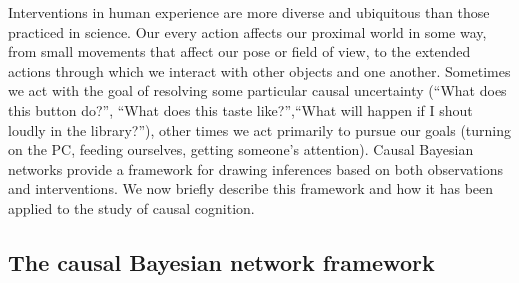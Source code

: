\documentclass{cambridge7A}%
\begin{document}
Interventions in human experience are more diverse and ubiquitous than those practiced in science.  Our every action affects our proximal world in some way, from small movements that affect our pose or field of view, to the extended actions through which we interact with other objects and one another.  Sometimes we act with the goal of resolving some particular causal uncertainty (``What does this button do?'', ``What does this taste like?'',``What will happen if I shout loudly in the library?''), other times we act primarily to pursue our goals (turning on the PC, feeding ourselves, getting someone's attention).  Causal Bayesian networks \citep{pearl2000causality} provide a framework for drawing inferences based on both observations and interventions. 
We now briefly describe this framework and how it has been applied to the study of causal cognition.


\subsection{The causal Bayesian network framework}
\end{document}
